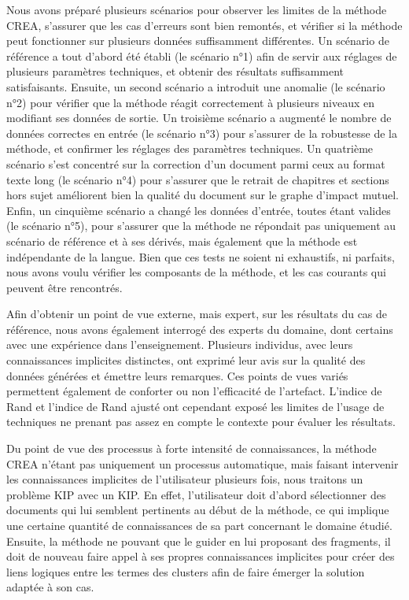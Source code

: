 \bigskip

Nous avons préparé plusieurs scénarios pour observer les limites de la méthode CREA, s'assurer que les cas d'erreurs sont bien remontés, et vérifier si la méthode peut fonctionner sur plusieurs données suffisamment différentes.
Un scénario de référence a tout d'abord été établi (le scénario n°1) afin de servir aux réglages de plusieurs paramètres techniques, et obtenir des résultats suffisamment satisfaisants.
Ensuite, un second scénario a introduit une anomalie (le scénario n°2) pour vérifier que la méthode réagit correctement à plusieurs niveaux en modifiant ses données de sortie.
Un troisième scénario a augmenté le nombre de données correctes en entrée (le scénario n°3) pour s'assurer de la robustesse de la méthode, et confirmer les réglages des paramètres techniques.
Un quatrième scénario s'est concentré sur la correction d'un document parmi ceux au format texte long (le scénario n°4) pour s'assurer que le retrait de chapitres et sections hors sujet améliorent bien la qualité du document sur le graphe d'impact mutuel.
Enfin, un cinquième scénario a changé les données d'entrée, toutes étant valides (le scénario n°5), pour s'assurer que la méthode ne répondait pas uniquement au scénario de référence et à ses dérivés, mais également que la méthode est indépendante de la langue.
Bien que ces tests ne soient ni exhaustifs, ni parfaits, nous avons voulu vérifier les composants de la méthode, et les cas courants qui peuvent être rencontrés.

\bigskip

Afin d'obtenir un point de vue externe, mais expert, sur les résultats du cas de référence, nous avons également interrogé des experts du domaine, dont certains avec une expérience dans l'enseignement.
Plusieurs individus, avec leurs connaissances implicites distinctes, ont exprimé leur avis sur la qualité des données générées et émettre leurs remarques.
Ces points de vues variés permettent également de conforter ou non l'efficacité de l'artefact.
L'indice de Rand et l'indice de Rand ajusté ont cependant exposé les limites de l'usage de techniques ne prenant pas assez en compte le contexte pour évaluer les résultats.

\bigskip

Du point de vue des processus à forte intensité de connaissances, la méthode CREA n'étant pas uniquement un processus automatique, mais faisant intervenir les connaissances implicites de l'utilisateur plusieurs fois, nous traitons un problème KIP avec un KIP.
En effet, l'utilisateur doit d'abord sélectionner des documents qui lui semblent pertinents au début de la méthode, ce qui implique une certaine quantité de connaissances de sa part concernant le domaine étudié.
Ensuite, la méthode ne pouvant que le guider en lui proposant des fragments, il doit de nouveau faire appel à ses propres connaissances implicites pour créer des liens logiques entre les termes des clusters afin de faire émerger la solution adaptée à son cas.

